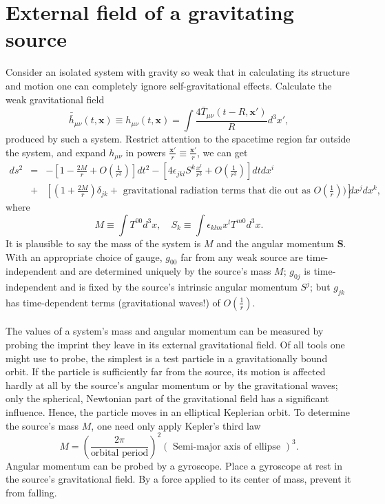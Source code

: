 \section{External field of a gravitating source}
Consider an isolated system with gravity so weak that in calculating its structure and motion one can completely ignore self-gravitational effects. Calculate the weak gravitational field
\[\bar{\bar{h}}_{\mu\nu}(t,\bm{x}) \equiv h_{\mu\nu}(t,\bm{x}) = \int \frac{4\bar{T}_{\mu\nu}(t-R,\bm{x}')}{R} d^3x',\]
produced by such a system. Restrict attention to the spacetime region far outside the system, and expand $h_{\mu\nu}$ in powers $\frac{\bm{x}'}{r} \equiv \frac{\bm{x}'}{r}$, we can get
\begin{eqnarray}
ds^2 &=& -\left[1-\frac{2M}{r} + O(\frac{1}{r^3}) \right]dt^2 - \left[4\epsilon_{jkl}S^k \frac{x^l}{r^3} + O(\frac{1}{r^3})  \right] dtdx^i  \nonumber \\
&+& \left[(1+\frac{2M}{r})\delta_{jk} + \mbox{ gravitational radiation terms that die out as } O(\frac{1}{r}) ) \right]dx^j dx^k , \nonumber
\end{eqnarray}
where
\[M \equiv \int T^{00}d^3x , \quad S_k \equiv \int \epsilon_{klm}x^l T^{m0} d^3x .\]
It is plausible to say the mass of the system is $M$ and the angular momentum $\bm{S}$. With an appropriate choice of gauge, $g_{00}$ far from any weak source are time-independent and are determined uniquely by the source's mass $M$; $g_{0j}$ is time-independent and is fixed by the source's intrinsic angular momentum $S^j$; but $g_{jk}$ has time-dependent terms (gravitational waves!) of $O(\frac{1}{r})$.
\\ \\
The values of a system's mass and angular momentum can be measured by probing the imprint they leave in its external gravitational field. 
Of all tools one might use to probe, the simplest is a test particle in a gravitationally bound orbit. 
If the particle is sufficiently far from the source, its motion is affected hardly at all by the source's angular momentum or by the gravitational waves; only the spherical, Newtonian part of the gravitational field has a significant influence. 
Hence, the particle moves in an elliptical Keplerian orbit. To determine the source's mass $M$, one need only apply Kepler's third law
\[M = \left( \frac{2\pi}{\mbox{orbital period}} \right)^2 \left(\mbox{ Semi-major axis of ellipse } \right)^3.\]
Angular momentum can be probed by a gyroscope.
Place a gyroscope at rest in the source's gravitational field.
By a force applied to its center of mass, prevent it from falling. 
